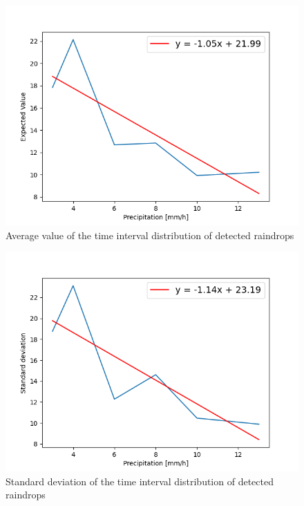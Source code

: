 \begin{figure}[H]
    \centering
    \includegraphics[keepaspectratio, scale=0.5]{images/png/kitaiti.png}
    \caption{Average value of the time interval distribution of detected raindrops}
    \label{Fig:5.7}
\end{figure}

\begin{figure}[H]
    \centering
    \includegraphics[keepaspectratio, scale=0.5]{images/png/hyouzunhensa.png}
    \caption{Standard deviation of the time interval distribution of detected raindrops}
    \label{Fig:5.8}
\end{figure}